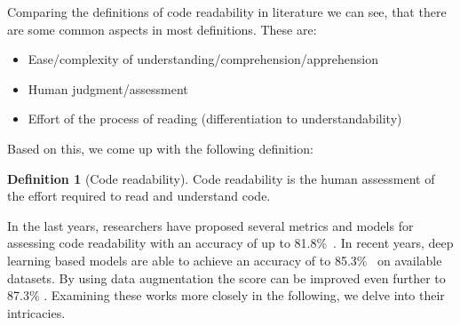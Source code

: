 \documentclass[%
class=scrreprt,
chapterprefix=false,%
open=right,%
twoside=false,%
paper=a4,%
logofile={Logo\_zentral\_farbig\_EN.png},%
thesistype=master,%
UKenglish,%
]{se2thesis}
\theoremstyle{definition}
\newtheorem{definition}{Definition}[section]
\begin{document}
	
		

	Comparing the definitions of code readability in literature we can see, that there are some common aspects in most definitions. These are:
	\begin{itemize}
		\item Ease/complexity of understanding/comprehension/apprehension
		\item Human judgment/assessment
		\item Effort of the process of reading (differentiation to understandability)
	\end{itemize}
	Based on this, we come up with the following definition: 
	\begin{definition}[Code readability]
		Code readability is the human assessment of the effort required to read and understand code.
	\end{definition}

	In the last years, researchers have proposed several metrics and models for assessing code readability with an accuracy of up to 81.8\%~\cite{buse2009learning, posnett2011simpler, dorn2012general, }. In recent years, deep learning based models are able to achieve an accuracy of to 85.3\%~\cite{mi2018improving, mi2022towards} on available datasets. By using data augmentation the score can be improved even further to 87.3\% \cite{mi2021effectiveness}.
	Examining these works more closely in the following, we delve into their intricacies.
	
\end{document}
